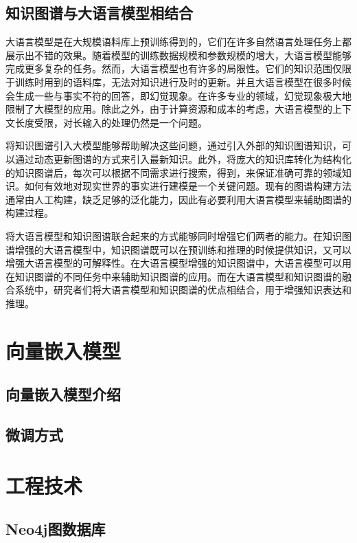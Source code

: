 \subsection{知识图谱与大语言模型相结合}

大语言模型是在大规模语料库上预训练得到的，它们在许多自然语言处理任务上都展示出不错的效果。随着模型的训练数据规模和参数规模的增大，大语言模型能够完成更多复杂的任务。然而，大语言模型也有许多的局限性。它们的知识范围仅限于训练时用到的语料库\cite{AlKhamissi2022}，无法对知识进行及时的更新。并且大语言模型在很多时候会生成一些与事实不符的回答\cite{Ji2023}，即幻觉现象。在许多专业的领域，幻觉现象极大地限制了大模型的应用。除此之外，由于计算资源和成本的考虑，大语言模型的上下文长度受限，对长输入的处理仍然是一个问题。

将知识图谱引入大模型能够帮助解决这些问题，通过引入外部的知识图谱知识，可以通过动态更新图谱的方式来引入最新知识。此外，将庞大的知识库转化为结构化的知识图谱后，每次可以根据不同需求进行搜索，得到，来保证准确可靠的领域知识。如何有效地对现实世界的事实进行建模是一个关键问题。现有的图谱构建方法通常由人工构建，缺乏足够的泛化能力，因此有必要利用大语言模型来辅助图谱的构建过程。

将大语言模型和知识图谱联合起来的方式能够同时增强它们两者的能力。在知识图谱增强的大语言模型中，知识图谱既可以在预训练和推理的时候提供知识\cite{Zhang2019}，又可以增强大语言模型的可解释性\cite{Lin2019}。在大语言模型增强的知识图谱中，大语言模型可以用在知识图谱的不同任务中来辅助知识图谱的应用。而在大语言模型和知识图谱的融合系统中，研究者们将大语言模型和知识图谱的优点相结合，用于增强知识表达\cite{Yasunaga2022}和推理\cite{Choudhary2023}。

\section{向量嵌入模型}

\subsection{向量嵌入模型介绍}


\subsection{微调方式}

\section{工程技术}

\subsection{Neo4j图数据库}

